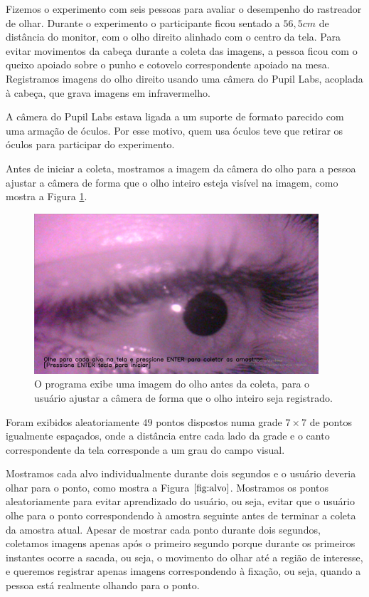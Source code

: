 Fizemos o experimento com seis pessoas para avaliar o desempenho do rastreador de olhar. Durante o experimento o participante ficou sentado a $56,5cm$ de distância do monitor, com o olho direito alinhado com o centro da tela. Para evitar movimentos da cabeça durante a coleta das imagens, a pessoa ficou com o queixo apoiado sobre o punho e cotovelo correspondente apoiado na mesa. Registramos imagens do olho direito usando uma câmera do Pupil Labs, acoplada à cabeça, que grava imagens em infravermelho.

A câmera do Pupil Labs estava ligada a um suporte de formato parecido com uma armação de óculos. Por esse motivo, quem usa óculos teve que retirar os óculos para participar do experimento.

Antes de iniciar a coleta, mostramos a imagem da câmera do olho para a pessoa ajustar a câmera de forma que o olho inteiro esteja visível na imagem, como mostra a Figura \ref{fig:ajustando_olho}.

\begin{figure}
\centering
\includegraphics[scale=1]{imagens/ajustando_camera.png}
\caption{O programa exibe uma imagem do olho antes da coleta, para o usuário ajustar a câmera de forma que o olho inteiro seja registrado.}
\label{fig:ajustando_olho}
\end{figure}

Foram exibidos aleatoriamente $49$ pontos dispostos numa grade $7 \times 7$ de pontos igualmente espaçados, onde a distância entre cada lado da grade e o canto correspondente da tela corresponde a um grau do campo visual.

Mostramos cada alvo individualmente durante dois segundos e o usuário deveria olhar para o ponto, como mostra a Figura $\ref{fig:alvo}$. Mostramos os pontos aleatoriamente para evitar aprendizado do usuário, ou seja, evitar que o usuário olhe para o ponto correspondendo à amostra seguinte antes de terminar a coleta da amostra atual. Apesar de mostrar cada ponto durante dois segundos, coletamos imagens apenas após o primeiro segundo porque durante os primeiros instantes ocorre a sacada, ou seja, o movimento do olhar até a região de interesse, e queremos registrar apenas imagens correspondendo à fixação, ou seja, quando a pessoa está realmente olhando para o ponto.

